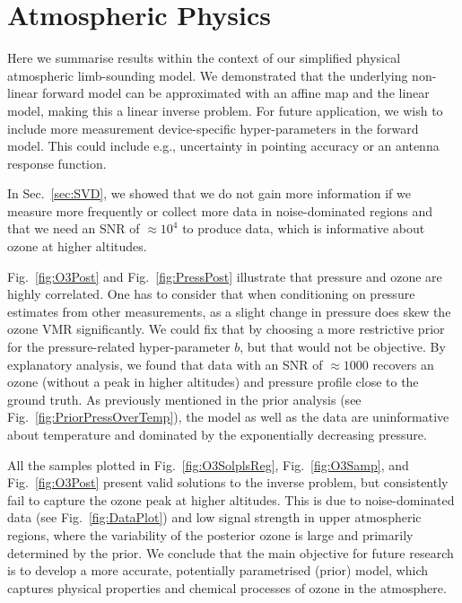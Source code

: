 \section{Atmospheric Physics}
Here we summarise results within the context of our simplified physical atmospheric limb-sounding model.
We demonstrated that the underlying non-linear forward model can be approximated with an affine map and the linear model, making this a linear inverse problem.
For future application, we wish to include more measurement device-specific hyper-parameters in the forward model.
This could include e.g., uncertainty in pointing accuracy or an antenna response function.

In Sec.~\ref{sec:SVD}, we showed that we do not gain more information if we measure more frequently or collect more data in noise-dominated regions and that we need an SNR of $\approx10^4$ to produce data, which is informative about ozone at higher altitudes.

Fig.~\ref{fig:O3Post} and Fig.~\ref{fig:PressPost} illustrate that pressure and ozone are highly correlated.
One has to consider that when conditioning on pressure estimates from other measurements, as a slight change in pressure does skew the ozone VMR significantly.
We could fix that by choosing a more restrictive prior for the pressure-related hyper-parameter $b$, but that would not be objective.
By explanatory analysis, we found that data with an SNR of $\approx 1000$ recovers an ozone (without a peak in higher altitudes) and pressure profile close to the ground truth.
As previously mentioned in the prior analysis (see Fig.~\ref{fig:PriorPressOverTemp}), the model as well as the data are uninformative about temperature and dominated by the exponentially decreasing pressure.

All the samples plotted in Fig.~\ref{fig:O3SolplsReg}, Fig.~\ref{fig:O3Samp}, and Fig.~\ref{fig:O3Post} present valid solutions to the inverse problem, but consistently fail to capture the ozone peak at higher altitudes.
This is due to noise-dominated data (see Fig.~\ref{fig:DataPlot}) and low signal strength in upper atmospheric regions, where the variability of the posterior ozone is large and primarily determined by the prior.
We conclude that the main objective for future research is to develop a more accurate, potentially parametrised (prior) model, which captures physical properties and chemical processes of ozone in the atmosphere.




